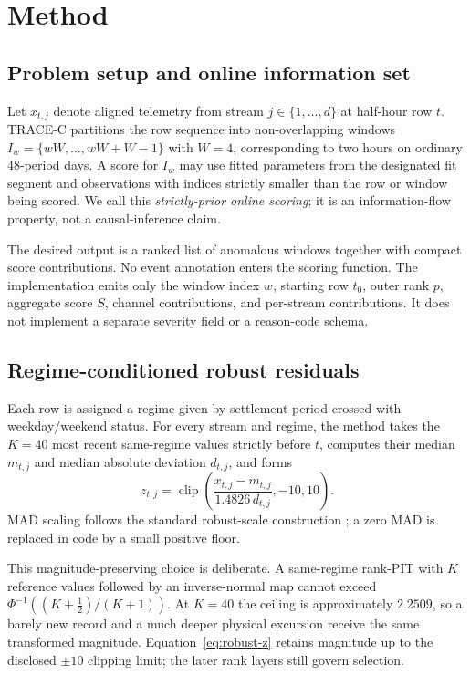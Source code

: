 \section{Method}

\subsection{Problem setup and online information set}

Let $x_{t,j}$ denote aligned telemetry from stream $j\in\{1,\ldots,d\}$ at
half-hour row $t$. TRACE-C partitions the row sequence into non-overlapping
windows $I_w=\{wW,\ldots,wW+W-1\}$ with $W=4$, corresponding to two hours on
ordinary 48-period days. A score for $I_w$ may use fitted parameters from the
designated fit segment and observations with indices strictly smaller than the
row or window being scored. We call this \emph{strictly-prior online scoring};
it is an information-flow property, not a causal-inference claim.

The desired output is a ranked list of anomalous windows together with compact
score contributions. No event annotation enters the scoring function. The
implementation emits only the window index $w$, starting row $t_0$, outer rank
$p$, aggregate score $S$, channel contributions, and per-stream contributions.
It does not implement a separate severity field or a reason-code schema.

\subsection{Regime-conditioned robust residuals}

Each row is assigned a regime given by settlement period crossed with
weekday/weekend status. For every stream and regime, the method takes the
$K=40$ most recent same-regime values strictly before $t$, computes their
median $m_{t,j}$ and median absolute deviation $d_{t,j}$, and forms
\begin{equation}
 z_{t,j}=\operatorname{clip}\!\left(
 \frac{x_{t,j}-m_{t,j}}{1.4826\,d_{t,j}},-10,10\right).
 \label{eq:robust-z}
\end{equation}
MAD scaling follows the standard robust-scale construction
\citep{rousseeuw1993mad}; a zero MAD is replaced in code by a small positive
floor.

This magnitude-preserving choice is deliberate. A same-regime rank-PIT with
$K$ reference values followed by an inverse-normal map cannot exceed
\(\Phi^{-1}((K+\tfrac12)/(K+1))\). At $K=40$ the ceiling is approximately
$2.2509$, so a barely new record and a much deeper physical excursion receive
the same transformed magnitude. Equation~\eqref{eq:robust-z} retains magnitude
up to the disclosed $\pm10$ clipping limit; the later rank layers still govern
selection.

